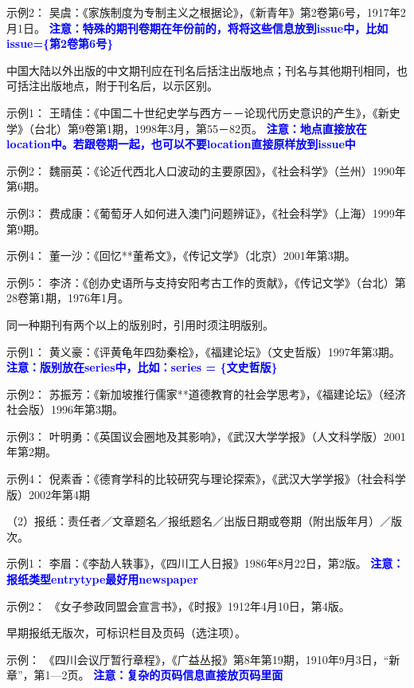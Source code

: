 \documentclass{article}
\newcommand{\qd}[1]{\textbf{\textcolor{blue}{#1}}}
\begin{document}
示例2：
吴虞：《家族制度为专制主义之根据论》，《新青年》第2卷第6号，1917年2月1日。
 \qd{注意：特殊的期刊卷期在年份前的，将将这些信息放到issue中，比如issue=\{第2卷第6号\}}

中国大陆以外出版的中文期刊应在刊名后括注出版地点；刊名与其他期刊相同，也可括注出版地点，附于刊名后，以示区别。

示例1：
王晴佳：《中国二十世纪史学与西方－－论现代历史意识的产生》，《新史学》（台北）第9卷第1期，1998年3月，第55－82页。
\qd{注意：地点直接放在location中。若跟卷期一起，也可以不要location直接原样放到issue中}

示例2：
魏丽英：《论近代西北人口波动的主要原因》，《社会科学》（兰州）1990年第6期。

示例3：
费成康：《葡萄牙人如何进入澳门问题辨证》，《社会科学》（上海）1999年第9期。

示例4：
董一沙：《回忆**董希文》，《传记文学》（北京）2001年第3期。

示例5：
李济：《创办史语所与支持安阳考古工作的贡献》，《传记文学》（台北）第28卷第1期，1976年1月。


同一种期刊有两个以上的版别时，引用时须注明版别。

示例1：
黄义豪：《评黄龟年四劾秦桧》，《福建论坛》（文史哲版）1997年第3期。
\qd{注意：版别放在series中，比如：series = \{文史哲版\}}

示例2：
苏振芳：《新加坡推行儒家**道德教育的社会学思考》，《福建论坛》（经济社会版）1996年第3期。

示例3：
叶明勇：《英国议会圈地及其影响》，《武汉大学学报》（人文科学版）2001年第2期。

示例4：
倪素香：《德育学科的比较研究与理论探索》，《武汉大学学报》（社会科学版）2002年第4期

（2）报纸：责任者／文章题名／报纸题名／出版日期或卷期（附出版年月）／版次。

示例1：
李眉：《李劼人轶事》，《四川工人日报》1986年8月22日，第2版。
\qd{注意：报纸类型entrytype最好用newspaper}

示例2：
《女子参政同盟会宣言书》，《时报》1912年4月10日，第4版。

早期报纸无版次，可标识栏目及页码（选注项）。

示例：
《四川会议厅暂行章程》，《广益丛报》第8年第19期，1910年9月3日，“新章”，第1—2页。
\qd{注意：复杂的页码信息直接放页码里面}
\end{document}
